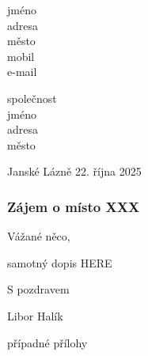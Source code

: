 \documentclass{article}
\def\wloss{%
\begingroup
\def\i{\pgfusepath{clip}}%
\def\k{\pgfusepath{stroke}}%
\let\o\pgfpathclose
\let\s\pgfusepathqfillstroke
\def\p ##1##2{\pgfqpoint{##1bp}{##2bp}}%
\def\m ##1 ##2 {\pgfpathmoveto{\p{##1}{##2}}}%
\def\r ##1 ##2 ##3 ##4 {\pgfpathrectangle{\p{##1}{##2}}{%
\p{##3}{##4}}}%
\def\l ##1 ##2 {\pgfpathlineto{\p{##1}{##2}}}%
\def\c ##1 ##2 ##3 ##4 ##5 ##6 {%
\pgfpathcurveto{\p{##1}{##2}}{\p{##3}{##4}}{\p{##5}{##6}}}%
\begin{tikzpicture}
\pgftransformscale{.08}
\m 133.06666667 201.73333333
\l 132.66666667 138
\l 93.06666667 137.6
\l 53.33333333 137.33333333
\l 53.33333333 166.66666667
\l 53.33333333 196
\l 48.66666667 196
\l 44 196
\l 44 166.66666667
\l 44 137.33333333
\l 22 137.33333333
\l 0 137.33333333
\l 0 133.33333333
\l 0 129.33333333
\l 22 129.33333333
\l 44 129.33333333
\l 44 97.33333333
\l 44 65.33333333
\l 48.66666667 65.33333333
\l 53.33333333 65.33333333
\l 53.33333333 97.33333333
\l 53.33333333 129.33333333
\l 67.33333333 129.33333333
\l 81.33333333 129.33333333
\l 81.33333333 97.33333333
\l 81.33333333 65.33333333
\l 86 65.33333333
\l 90.66666667 65.33333333
\l 90.66666667 97.33333333
\l 90.66666667 129.33333333
\l 112 129.33333333
\l 133.33333333 129.33333333
\l 133.33333333 64.66666667
\l 133.33333333 -0
\l 137.33333333 -0
\l 141.33333333 -0
\l 141.33333333 64.66666667
\l 141.33333333 129.33333333
\l 166.66666667 129.33333333
\l 192 129.33333333
\l 192 107.33333333
\l 192 85.33333333
\l 177.86666667 85.33333333
\l 163.86666667 85.33333333
\l 164.26666667 80.93333333
\l 164.66666667 76.66666667
\l 215.06666667 76.26666667
\l 265.33333333 76
\l 265.33333333 80.66666667
\l 265.33333333 85.33333333
\l 232.66666667 85.33333333
\l 200 85.33333333
\l 200 107.33333333
\l 200 129.33333333
\l 232.66666667 129.33333333
\l 265.33333333 129.33333333
\l 265.33333333 133.33333333
\l 265.33333333 137.33333333
\l 250.66666667 137.33333333
\l 236 137.33333333
\l 236 152.66666667
\l 236 168
\l 231.33333333 168
\l 226.66666667 168
\l 226.66666667 152.66666667
\l 226.66666667 137.33333333
\l 213.33333333 137.33333333
\l 200 137.33333333
\l 200 166.66666667
\l 200 196
\l 196 196
\l 192 196
\l 191.73333333 167.06666667
\l 191.33333333 138
\l 166.66666667 138
\l 142 138
\l 141.6 201.73333333
\l 141.33333333 265.33333333
\l 137.33333333 265.33333333
\l 133.33333333 265.33333333
\pgfsetfillcolor{white}
\pgfusepath{fill}
\k
\end{tikzpicture}
\endgroup
}
\begin{document}
\fontsize{10pt}{10pt}\selectfont\setlength\parindent{0em}
jméno\\
adresa\\
město\\
mobil\\
e-mail\\
\vspace{2em}

společnost\\
jméno\\
adresa\\
město\\
\vspace{1em}

\begin{flushright}
Janské Lázně 22. října 2025
\end{flushright}
\vspace{1em}

\subsubsection*{Zájem o místo XXX}
Vážané něco,\par
samotný dopis HERE\par
S pozdravem\par
\vspace{0.5em}
{\selectfont Libor Halík}\par
\vspace{0.5em}
případné přílohy
\vfill
{}
\end{document}
